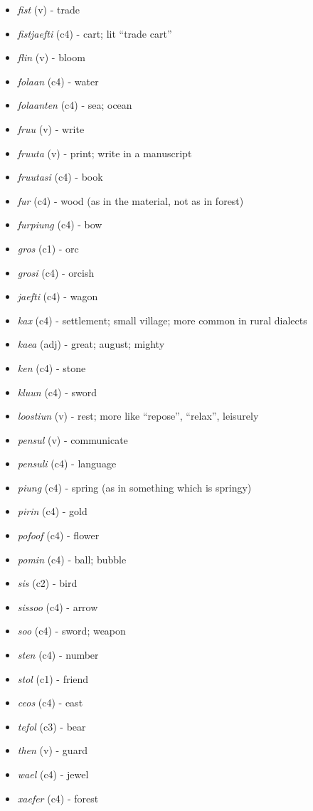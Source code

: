 \documentclass[main.tex]{subfiles}
\newcommand{\lexitem}[3]{\item \textit{#1} (#2) - #3}
\begin{document}
\begin{itemize}
    \lexitem{fist}{v}{trade}
    \lexitem{fistjaefti}{c4}{cart; lit ``trade cart''}
    \lexitem{flin}{v}{bloom}
    \lexitem{folaan}{c4}{water}
    \lexitem{folaanten}{c4}{sea; ocean}
    \lexitem{fruu}{v}{write}
    \lexitem{fruuta}{v}{print; write in a manuscript}
    \lexitem{fruutasi}{c4}{book}
    \lexitem{fur}{c4}{wood (as in the material, not as in forest)}
    \lexitem{furpiung}{c4}{bow}
    \lexitem{gros}{c1}{orc}
    \lexitem{grosi}{c4}{orcish}
    \lexitem{jaefti}{c4}{wagon}
    \lexitem{kax}{c4}{settlement; small village; more common in rural dialects}
    \lexitem{kaea}{adj}{great; august; mighty}
    \lexitem{ken}{c4}{stone}
    \lexitem{kluun}{c4}{sword}
    \lexitem{loostiun}{v}{rest; more like ``repose'', ``relax'', leisurely}
    \lexitem{pensul}{v}{communicate}
    \lexitem{pensuli}{c4}{language}
    \lexitem{piung}{c4}{spring (as in something which is springy)}
    \lexitem{pirin}{c4}{gold}
    \lexitem{pofoof}{c4}{flower}
    \lexitem{pomin}{c4}{ball; bubble}
    \lexitem{sis}{c2}{bird}
    \lexitem{sissoo}{c4}{arrow}
    \lexitem{soo}{c4}{sword; weapon}
    \lexitem{sten}{c4}{number}
    \lexitem{stol}{c1}{friend}
    \lexitem{ceos}{c4}{east}
    \lexitem{tefol}{c3}{bear}
    \lexitem{then}{v}{guard}
    \lexitem{wael}{c4}{jewel}
    \lexitem{xaefer}{c4}{forest}
\end{itemize}
\end{document}
